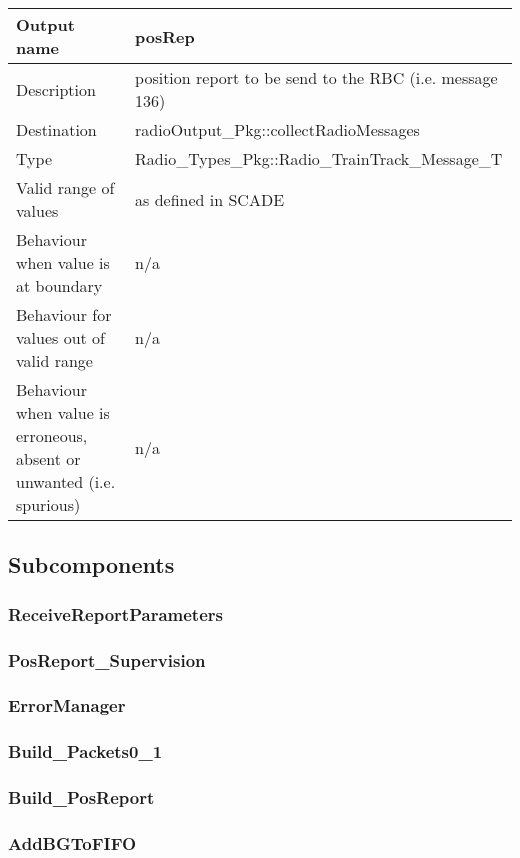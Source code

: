 \begin{longtable}{p{}p{}}
\toprule
Output name				& posRep \\
\midrule
Description				& position report to be send to the RBC (i.e. message 136) \\
\midrule
Destination				& radioOutput\_Pkg::collectRadioMessages \\ 
\midrule
Type					& Radio\_Types\_Pkg::Radio\_TrainTrack\_Message\_T \\
\midrule
Valid range of values	& as defined in SCADE \\
\midrule
Behaviour when value is at boundary	& n/a \\
\midrule
Behaviour for values out of valid range	& n/a \\
\midrule
Behaviour when value is erroneous, absent or unwanted (i.e. spurious) & n/a \\
\bottomrule
\end{longtable}


\subsection{Subcomponents}\label{s:provide_position_report_subcomponents}


\subsubsection{ReceiveReportParameters}


\subsubsection{PosReport\_Supervision}


\subsubsection{ErrorManager}


\subsubsection{Build\_Packets0\_1}


\subsubsection{Build\_PosReport}


\subsubsection{AddBGToFIFO}


